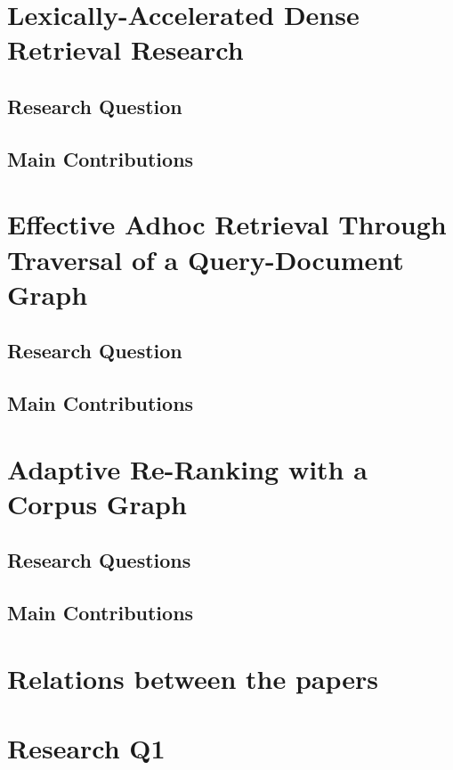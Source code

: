 \documentclass[sigconf,authorversion,nonacm]{acmart}
\begin{document}
\section{Lexically-Accelerated Dense Retrieval Research } 

\subsection{Research
Question}

\subsection{Main Contributions} 


\section{Effective Adhoc Retrieval Through Traversal of a Query-Document Graph}

    \subsection{Research Question} 

    \subsection{Main Contributions} 


\section{Adaptive Re-Ranking with a Corpus Graph}

\subsection{Research Questions} 

\subsection{Main Contributions} 

\section{Relations between the papers}

\section{Research Q1}
\end{document}
